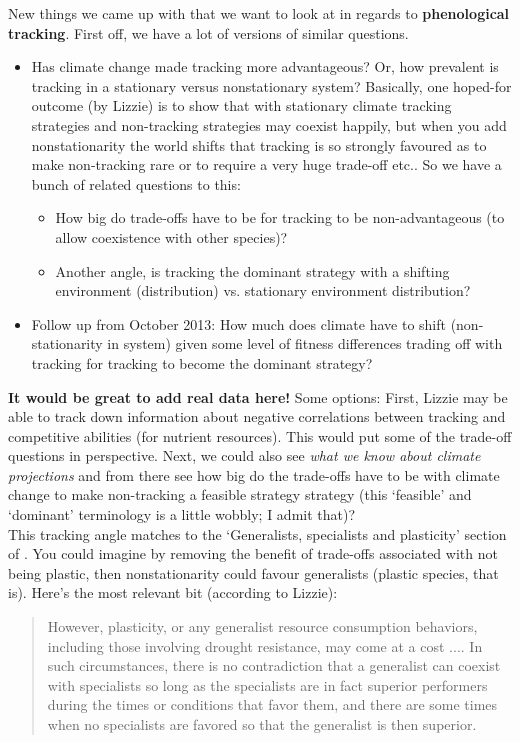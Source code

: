 \documentclass[11pt,a4paper,oneside]{article}
\begin{document}
\noindent New things we came up with that we want to look at in regards to {\bf phenological tracking}. First off, we have a lot of versions of similar questions. 
\begin{itemize}
\item Has climate change made tracking more advantageous? Or, how prevalent is tracking in a stationary versus nonstationary system? Basically, one hoped-for outcome (by Lizzie) is to show that with stationary climate tracking strategies and non-tracking strategies may coexist happily, but when you add nonstationarity the world shifts that tracking is so strongly favoured as to make non-tracking rare or to require a very huge trade-off etc.. So we have a bunch of related questions to this:
\begin{itemize}
\item How big do trade-offs have to be for tracking to be non-advantageous (to allow coexistence with other species)?
\item Another angle, is tracking the dominant strategy with a shifting environment (distribution) vs. stationary environment distribution?
\end{itemize}
\item Follow up from October 2013: How much does climate have to shift (non-stationarity in system) given some level of fitness differences trading off with tracking for tracking to become the dominant strategy?
\end{itemize}
{\bf It would be great to add real data here!} Some options: First, Lizzie may be able to track down information about negative correlations between tracking and competitive abilities (for nutrient resources). This would put some of the trade-off questions in perspective. Next, we could also see  \emph{what we know about climate projections} and from there see how big do the trade-offs have to be with climate change to make non-tracking a feasible strategy strategy (this `feasible' and `dominant' terminology is a little wobbly; I admit that)?\\

\noindent This tracking angle matches to the `Generalists, specialists and plasticity' section of \citet{Chesson:2004eo}. You could imagine by removing the benefit of trade-offs associated with not being plastic, then nonstationarity could favour generalists (plastic species, that is). Here's the most relevant bit (according to Lizzie):
\begin{quote}
However, plasticity, or any generalist resource consumption
behaviors, including those involving drought resistance,
may come at a cost .... In such circumstances, there is no
contradiction that a generalist can coexist with specialists
so long as the specialists are in fact superior performers
during the times or conditions that favor them, and there 
are some times when no specialists are favored so that the
generalist is then superior.
\end{quote}
\end{document}
